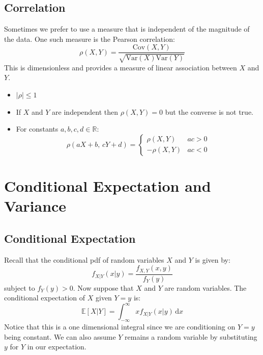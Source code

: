 \documentclass[12pt]{article}
\begin{document}
\subsection{Correlation}
Sometimes we prefer to use a measure that is independent of the magnitude of the data. One such measure is the Pearson correlation:
\[\rho(X,Y)=\frac{\text{Cov}(X,Y)}{\sqrt{\text{Var}(X)\text{Var}(Y)}}\]
This is dimensionless and provides a measure of linear association between \(X\) and \(Y\).
\begin{itemize}
    \item \(|\rho|\leq 1\)
    \item If \(X\) and \(Y\) are independent then \(\rho(X,Y)=0\) but the converse is not true.
    \item For constants \(a,b,c,d\in\mathbb{R}\):
    \[\rho(aX+b,\, cY+d)=\begin{cases}
        \rho(X,Y)& ac>0 \\
        -\rho(X,Y)&ac<0
    \end{cases}\]
\end{itemize}
\clearpage
\section{Conditional Expectation and Variance}
\subsection{Conditional Expectation}
Recall that the conditional pdf of random variables \(X\) and \(Y\) is given by:
\[f_{X|Y}(x|y)=\frac{f_{X,Y}(x,y)}{f_Y(y)}\]
subject to \(f_Y(y)>0\). Now suppose that \(X\) and \(Y\) are random variables. The conditional expectation of \(X\) given \(Y=y\) is:
\[\mathbb{E}[X|Y]=\int^\infty_{-\infty}xf_{X|Y}(x|y)\,\text{d}x\]
Notice that this is a one dimensional integral since we are conditioning on \(Y=y\) being constant. We can also assume \(Y\) remains a random variable by substituting \(y\) for \(Y\) in our expectation.
\end{document}

